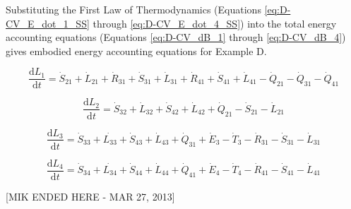 Substituting the First Law of Thermodynamics (Equations \ref{eq:D-CV_E_dot_1_SS} through \ref{eq:D-CV_E_dot_4_SS}) into the total energy accounting equations (Equations \ref{eq:D-CV_dB_1} through \ref{eq:D-CV_dB_4}) gives embodied energy accounting equations for Example D.

\begin{equation} \label{eq:D-embodied_acct_1}
	\frac{\mathrm{d}L_{1}}{\mathrm{d}t} 	 = \dot{S}_{21} + \dot{L}_{21} + \dot{R}_{31} + \dot{S}_{31} + \dot{L}_{31} + \dot{R}_{41} +\dot{S}_{41} + \dot{L}_{41} - \dot{Q}_{21} - \dot{Q}_{31} - \dot{Q}_{41}
\end{equation}

\begin{equation} \label{eq:D-embodied_acct_2}
	\frac{\mathrm{d}L_{2}}{\mathrm{d}t} 	 = \dot{S}_{32} + \dot{L}_{32} + \dot{S}_{42} + \dot{L}_{42} + \dot{Q}_{21} - \dot{S}_{21} - \dot{L}_{21}
\end{equation}

\begin{equation} \label{eq:D-embodied_acct_3}
	\frac{\mathrm{d}L_{3}}{\mathrm{d}t} 	 = \dot{S}_{33} + \dot{L_33} + \dot{S}_{43} + \dot{L}_{43} + \dot{Q}_{31} + \dot{E}_{3} - \dot{T}_{3} - \dot{R}_{31} - \dot{S}_{31} - \dot{L}_{31}
\end{equation}

\begin{equation} \label{eq:D-embodied_acct_4}
	\frac{\mathrm{d}L_{4}}{\mathrm{d}t} 	 = \dot{S}_{34} + \dot{L_34} + \dot{S}_{44} + \dot{L}_{44} + \dot{Q}_{41} + \dot{E}_{4} - \dot{T}_{4} - \dot{R}_{41} - \dot{S}_{41} - \dot{L}_{41}
\end{equation}

[MIK ENDED HERE - MAR 27, 2013]

%
%
%


